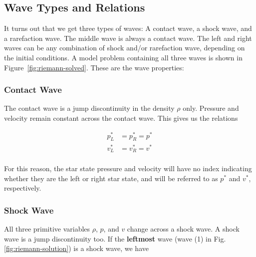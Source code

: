 \subsection{Wave Types and Relations}





It turns out that we get three types of waves: A contact wave, a shock wave,
and a rarefaction wave. The middle wave is always a contact wave. The left and
right waves can be any combination of shock and/or rarefaction wave, depending
on the initial conditions. A model problem containing all three waves is shown
in Figure~\ref{fig:riemann-solved}. These are the wave properties:






\subsubsection{Contact Wave}

The contact wave is a jump discontinuity in the density $\rho$ only.
Pressure and velocity remain constant across the contact wave.
This gives us the relations


\begin{align*}
	p^*_L &= p^*_R = p^*\\
	v^*_L &= v^*_R = v^*\\
\end{align*}

For this reason, the star state pressure and velocity will have no index
indicating whether they are the left or right star state, and will be referred
to as $p^*$ and $v^*$, respectively.









\subsubsection{Shock Wave}

All three primitive variables $\rho$, $p$, and $v$ change across a shock wave.
A shock wave is a jump discontinuity too. If the \textbf{leftmost} wave (wave
(1) in Fig. \ref{fig:riemann-solution}) is a shock wave, we have

